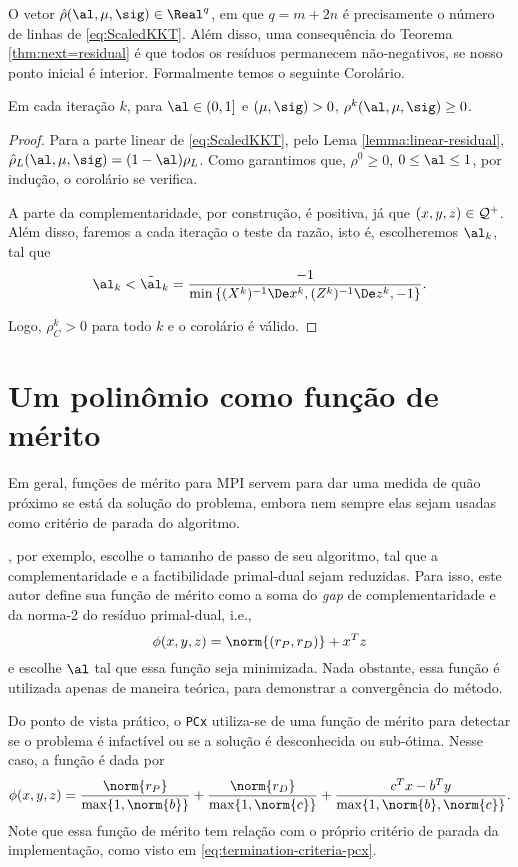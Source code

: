 O vetor  $\hat{\rho}(\al,\mu,\sig) \in \Real^q$, em que  $q = m+2n$ é
precisamente o número de linhas de  \eqref{eq:ScaledKKT}. Além disso, uma
consequência do Teorema \ref{thm:next=residual} é que todos os resíduos
permanecem não-negativos, se nosso ponto inicial é interior. Formalmente temos o seguinte Corolário. 

\begin{corol}\label{cor:positive-residual}
Em cada iteração $k$, para  $ \al \in(0,1]$ e  $(\mu, \sig)>0$,
$\rho^k(\al,\mu,\sig) \geq 0$.
\end{corol} 
\begin{proof}

Para a parte linear de  \eqref{eq:ScaledKKT}, pelo Lema
\ref{lemma:linear-residual}, $\hat{\rho}_L(\al,\mu,\sig) = (1-\al)\rho_L$. Como
garantimos que, $\rho^0\geq 0$, $0\leq\al\leq1 $, por  indução, o corolário
se verifica.

A parte da complementaridade, por construção,  é positiva, já que 
$(x,y,z)\in\mathcal{Q}^+$. Além disso, faremos a cada iteração o teste da razão, isto é, escolheremos $\alk $,
tal que 
\begin{equation}
	\label{eq:ratio-test}
\alk  < \tilde{\al}_k = \frac{-1}{\min\left\{
(X^k)^{-1}\Dex^k,(Z^k)^{-1}\Dez^k,-1 \right\}}. 
\end{equation}

Logo, $\rho^k_C>0$ para todo $k$ e o corolário é válido. 
\end{proof}

\section{Um polinômio como  função de mérito}


Em geral, funções de mérito para \ac{MPI} servem para dar uma medida de quão
próximo se está da solução do problema, embora nem sempre elas sejam usadas como
critério de parada do algoritmo. 

\textcite{Zhang:2006ic}, por exemplo, escolhe o tamanho de passo de seu
algoritmo, tal que a  complementaridade e a factibilidade primal-dual sejam
reduzidas. Para isso, este autor define sua função de mérito como a soma do
\emph{gap} de complementaridade e da norma-2 do resíduo primal-dual, i.e., \[\phi(x,y,z) =
\norm{(r_P,r_D)} + x^Tz\] e escolhe $\al$ tal que essa função seja minimizada.
Nada obstante, essa função é utilizada apenas de maneira teórica, para
demonstrar a convergência do método.

Do ponto de vista prático, o  \texttt{PCx} \cite{Czyzyk:1999hk} utiliza-se de
uma função de mérito para detectar se o problema é infactível ou se a solução é desconhecida
ou sub-ótima. Nesse caso, a função é dada por 
\[
\phi(x,y,z) = \frac{\norm{r_P}}{\max \{1,\norm{b} \} } + \frac{\norm{r_D}}{\max
\{1,\norm{c} \} } + \frac{c^Tx - b^Ty}{\max \{1,\norm{b},\norm{c} \} }.
\]
Note que essa função de mérito tem relação com o próprio critério de parada
da implementação, como visto em  \eqref{eq:termination-criteria-pcx}.



